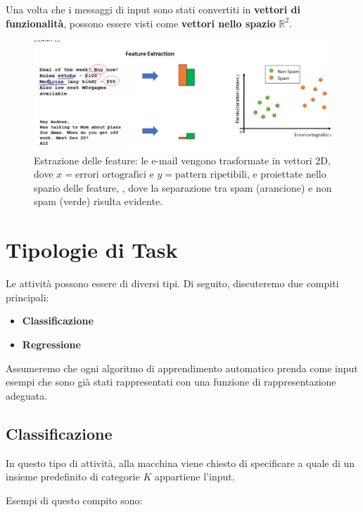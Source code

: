 Una volta che i messaggi di input sono stati convertiti in \textbf{vettori di funzionalità}, possono essere visti come \textbf{vettori nello spazio} $\mathbb{R}^2$.

\begin{figure}[htbp]
    \centering
    \includegraphics[width=\textwidth]{images/featureExtraction.png}
    \caption{Estrazione delle feature: le e-mail vengono trasformate in vettori 2D, dove $x = \text{errori ortografici e } y = \text{pattern ripetibili}$, e proiettate nello spazio delle feature, , dove la separazione tra spam (arancione) e non spam (verde) risulta evidente.}
    \label{fig:featureExtraction}
\end{figure}

\section{Tipologie di Task}

Le attività possono essere di diversi tipi. Di seguito, discuteremo due compiti principali:

\begin{itemize}
\item \textbf{Classificazione}
\item \textbf{Regressione}
\end{itemize}

Assumeremo che ogni algoritmo di apprendimento automatico prenda come input esempi che sono già stati rappresentati con una funzione di rappresentazione adeguata.

\subsection{Classificazione}

In questo tipo di attività, alla macchina viene chiesto di specificare a quale di un insieme predefinito di categorie $K$ appartiene l'input.

\noindent
Esempi di questo compito sono:

